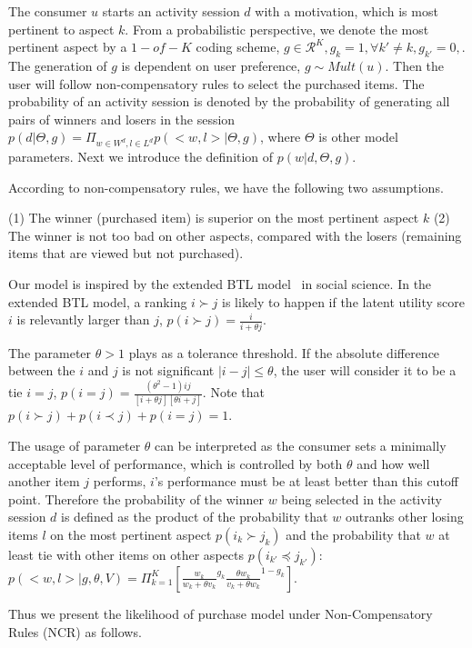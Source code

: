 \documentclass[sigconf]{acmart}
\begin{document}
The consumer $u$ starts an activity session $d$ with a motivation, which is most pertinent to aspect $k$. From a probabilistic perspective, we denote the most pertinent aspect by a $1-of-K$ coding scheme, $g\in \mathcal{R}^K, g_k=1,\forall k'\neq k, g_{k'}=0,$. The generation of $g$ is dependent on user preference, $g \sim Mult(u)$. Then the user will follow non-compensatory rules to select the purchased items. The probability of an activity session is denoted by the probability of generating all pairs of winners and losers in the session $p(d|\Theta, g)=\Pi_{w\in W^d, l \in L^d} p(<w,l>|\Theta,g)$, where $\Theta$ is other model parameters. Next we introduce the definition of $p(w|d,\Theta,g)$.

According to non-compensatory rules, we have the following two assumptions.

(1) The winner (purchased item) is superior on the most pertinent aspect $k$
(2)  The winner is not too bad on other aspects, compared with the losers (remaining items that are viewed but not purchased). 
  
Our model is inspired by the extended BTL model~\cite{Hunter2004MM} in social science. In the extended BTL model, a ranking $i \succ j$ is likely to happen if the latent utility score $i$ is relevantly larger than $j$, $p(i \succ j)=\frac{i}{i+ \theta j}$.  
  
 The parameter $\theta>1$ plays as a tolerance threshold. If the absolute difference between the $i$ and $j$ is not significant $|i-j|\leq \theta$, the user will consider it to be a tie $i=j$, $p(i = j)=\frac{(\theta^2-1)i j}{[i+\theta j][\theta i+ j]}$. Note that $p(i \succ j)+ p(i \prec j) + p(i=j) =1$. 
 
The usage of parameter $\theta$ can be interpreted as the consumer sets a minimally acceptable level of performance, which is controlled by both $\theta$ and how well another item $j$ performs, $i$'s performance must be at least better than this cutoff point. Therefore the probability of the winner $w$ being selected in the activity session $d$ is defined as the product of the probability that $w$ outranks other losing items $l$ on the most pertinent aspect $p(i_k\succ j_k)$ and the probability that $w$ at least tie with other items on other aspects $p(i_{k'} \preceq j_{k'})$: $p(<w,l>|g,\theta,V)  =  \Pi_{k=1}^{K}[ {\frac{w_k}{w_k+\theta v_k}}^{g_k} { \frac{\theta w_{k}}{v_{k}+\theta w_{k}}}^{1-g_k}]$. 

Thus we present the likelihood of purchase model under Non-Compensatory Rules (NCR) as follows.   
\end{document}
